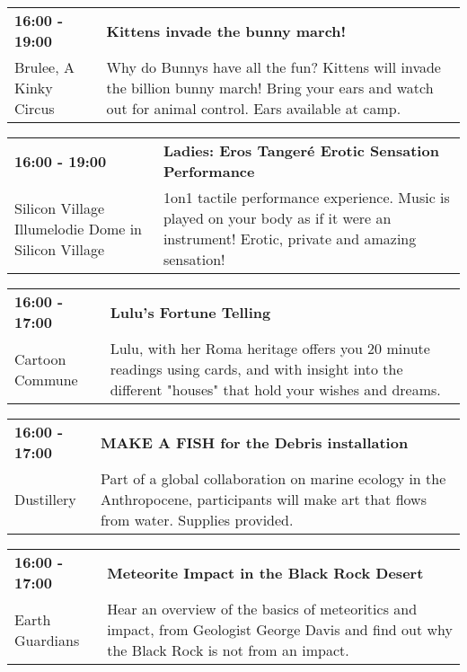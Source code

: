 \begin{tabular}{ p{1in} p{2.2in} }
    \textbf{16:00 - 19:00} & \textbf{Kittens invade the bunny march!} \\
    Brulee, A Kinky Circus \newline  & Why do Bunnys have all the fun? Kittens will invade the billion bunny march! Bring your ears and watch out for animal control. Ears available at camp. \\
    \hline 
\end{tabular}
    
\begin{tabular}{ p{1in} p{2.2in} }
    \textbf{16:00 - 19:00} & \textbf{Ladies: Eros Tanger\'e Erotic Sensation Performance} \\
    Silicon Village \newline Illumelodie Dome in Silicon Village & 1on1 tactile performance experience. Music is played on your body as if it were an instrument! Erotic, private and amazing sensation! \\
    \hline 
\end{tabular}
    
\begin{tabular}{ p{1in} p{2.2in} }
    \textbf{16:00 - 17:00} & \textbf{Lulu's Fortune Telling} \\
    Cartoon Commune \newline  & Lulu, with her Roma heritage offers you 20 minute readings using cards, and with insight into the different "houses" that hold your wishes and dreams. \\
    \hline 
\end{tabular}
    
\begin{tabular}{ p{1in} p{2.2in} }
    \textbf{16:00 - 17:00} & \textbf{MAKE A FISH for the Debris installation} \\
    Dustillery \newline  & Part of a global collaboration on marine ecology in the Anthropocene, participants will make art that flows from water. 
Supplies provided. \\
    \hline 
\end{tabular}
    
\begin{tabular}{ p{1in} p{2.2in} }
    \textbf{16:00 - 17:00} & \textbf{Meteorite Impact in the Black Rock Desert} \\
    Earth Guardians \newline  & Hear an overview of the basics of meteoritics and impact, from Geologist George Davis and find out why the Black Rock is not from an impact. \\
    \hline 
\end{tabular}
    
